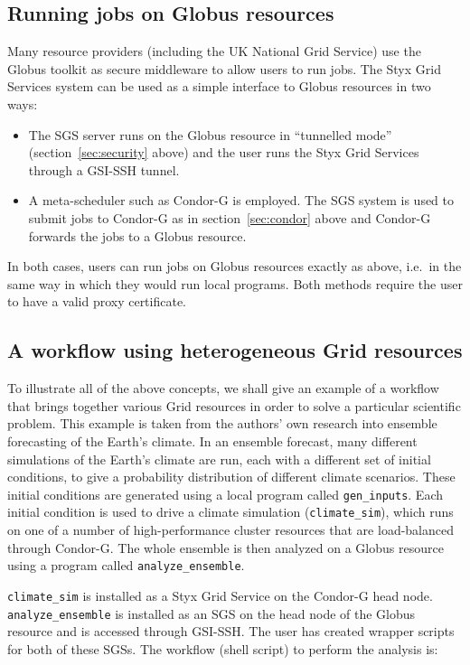 \documentclass[a4paper]{article}
\begin{document}
\subsection{Running jobs on Globus resources}
Many resource providers (including the UK National Grid Service) use the Globus toolkit as secure middleware to allow users to run jobs.  The Styx Grid Services system can be used as a simple interface to Globus resources in two ways:

\begin{itemize}
	\item The SGS server runs on the Globus resource in ``tunnelled mode'' (section~\ref{sec:security} above) and the user runs the Styx Grid Services through a GSI-SSH tunnel.
	\item A meta-scheduler such as Condor-G is employed.  The SGS system is used to submit jobs to Condor-G as in section~\ref{sec:condor} above and Condor-G forwards the jobs to a Globus resource.
\end{itemize}

In both cases, users can run jobs on Globus resources exactly as above, i.e.\ in the same way in which they would run local programs.  Both methods require the user to have a valid proxy certificate.

\subsection{A workflow using heterogeneous Grid resources}
To illustrate all of the above concepts, we shall give an example of a workflow that brings together various Grid resources in order to solve a particular scientific problem.  This example is taken from the authors' own research into ensemble forecasting of the Earth's climate.  In an ensemble forecast, many different simulations of the Earth's climate are run, each with a different set of initial conditions, to give a probability distribution of different climate scenarios.  These initial conditions are generated using a local program called \texttt{gen\_inputs}.  Each initial condition is used to drive a climate simulation (\texttt{climate\_sim}), which runs on one of a number of high-performance cluster resources that are load-balanced through Condor-G.  The whole ensemble is then analyzed on a Globus resource using a program called \texttt{analyze\_ensemble}.

\texttt{climate\_sim} is installed as a Styx Grid Service on the Condor-G head node.  \texttt{analyze\_ensemble} is installed as an SGS on the head node of the Globus resource and is accessed through GSI-SSH.  The user has created wrapper scripts for both of these SGSs.  The workflow (shell script) to perform the analysis is:
\end{document}

